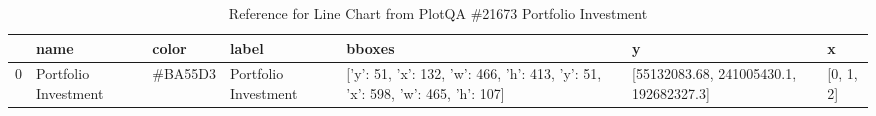 \begin{table}
\begin{tabular}{lllllll}
\toprule
 & name & color & label & bboxes & y & x \\
\midrule
0 & Portfolio Investment & \#BA55D3 & Portfolio Investment & [{'y': 51, 'x': 132, 'w': 466, 'h': 413}, {'y': 51, 'x': 598, 'w': 465, 'h': 107}] & [55132083.68, 241005430.1, 192682327.3] & [0, 1, 2] \\
\bottomrule
\end{tabular}
     \caption{Reference for Line Chart from PlotQA \#21673 Portfolio Investment}
     \label{tab:plotqa-line-21673-ref}
\end{table}
